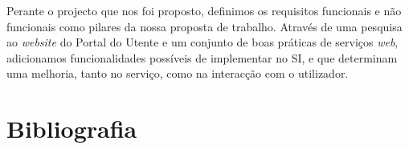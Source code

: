 \documentclass[12pt, a4paper, twoside]{report} %
\begin{document}
Perante o projecto que nos foi proposto, definimos os requisitos funcionais e não funcionais como pilares da nossa proposta de trabalho. 
Através de uma pesquisa ao \textit {website} do Portal do Utente e um conjunto de boas práticas de serviços \textit {web}, adicionamos funcionalidades possíveis de implementar no SI, e que determinam uma melhoria, tanto no serviço, como na interacção com o utilizador.

\chapter{Bibliografia}

\end{document}
